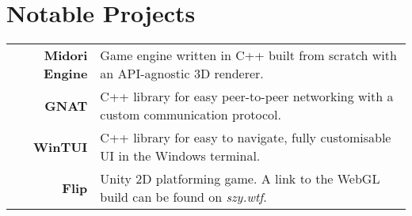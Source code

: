\section*{Notable Projects}
\begin{center}
    \vspace*{-5mm}
    \begin{tabular}{ r p{} }
      \textbf{Midori Engine} & Game engine written in C++ built from scratch with an API-agnostic 3D renderer. \\
      \textbf{GNAT}          & C++ library for easy peer-to-peer networking with a custom communication protocol. \\
      \textbf{WinTUI}        & C++ library for easy to navigate, fully customisable UI in the Windows terminal. \\
      \textbf{Flip}          & Unity 2D platforming game. A link to the WebGL build can be found on \textit{szy.wtf}.  \\
    \end{tabular}

\end{center}
